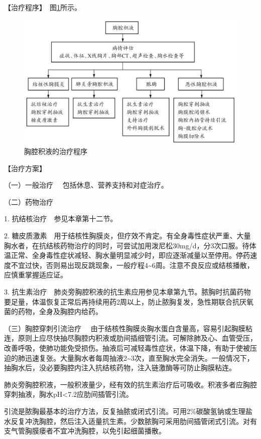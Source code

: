 【治疗程序】　图\ref{fig1-15-1}所示。

\begin{figure}[!htbp]
 \centering
 \includegraphics{./images/Image00037.jpg}
 \captionsetup{justification=centering}
 \caption{胸腔积液的治疗程序}
 \label{fig1-15-1}
  \end{figure} 

【治疗方案】

{（一）一般治疗} 　包括休息、营养支持和对症治疗。

{（二）药物治疗}

1. 抗结核治疗　参见本章第十二节。

2.
糖皮质激素　用于结核性胸膜炎，但疗效不肯定。有全身毒性症状严重、大量胸水者，在抗结核药物治疗的同时，可尝试加用泼尼松30mg/d，分3次口服。待体温正常、全身毒性症状减轻、胸水量明显减少时，即应逐渐减量以至停用。停药速度不宜过快，否则易出现反跳现象，一般疗程4\textasciitilde{}6周。注意不良反应或结核播散，应慎重掌握适应证。

3.
抗生素治疗　肺炎旁胸腔积液的抗生素应用参见本章第九节。脓胸时抗菌药物要足量，体温恢复正常后再持续用药2周以上，防止脓胸复发，急性期联合抗厌氧菌的药物，全身及胸腔内给药。

{（三）胸腔穿刺引流治疗}
　由于结核性胸膜炎胸水蛋白含量高，容易引起胸膜粘连，原则上应尽快抽尽胸腔内积液或肋间插细管引流。可解除肺及心、血管受压，改善呼吸，使肺功能免受损伤。抽液后可减轻毒性症状，体温下降，有助于使被压迫的肺迅速复张。大量胸水者每周抽液2\textasciitilde{}3次，直至胸水完全消失。一般情况下，抽胸水后，没必要胸腔内注入抗结核药物，注入链激酶等可防止胸膜粘连。

肺炎旁胸腔积液，一般积液量少，经有效的抗生素治疗后可吸收。积液多者应胸腔穿刺抽液，胸水pH\textless{}7.2应肋间插管引流。

引流是脓胸最基本的治疗方法，反复抽脓或闭式引流。可用2\%碳酸氢钠或生理盐水反复冲洗胸腔，然后注入适量抗生素。少数脓胸可采用肋间插管闭式引流。对有支气管胸膜瘘者不宜冲洗胸腔，以免引起细菌播散。

